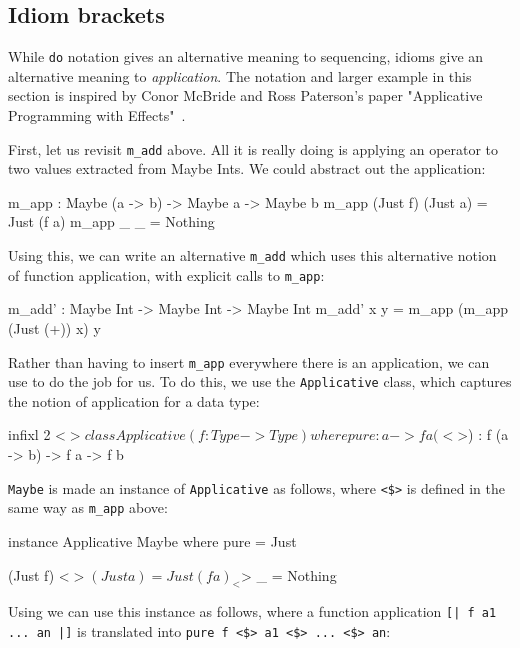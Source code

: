 \subsection{Idiom brackets}

While \texttt{do} notation gives an alternative meaning to sequencing, idioms give an
alternative meaning to \emph{application}. The notation and larger example in this
section is inspired by Conor McBride and Ross Paterson's paper "Applicative
Programming with Effects"~\cite{idioms}.

First, let us revisit \texttt{m\_add} above. All it is really doing is applying
an operator to two values extracted from Maybe Ints. We could abstract out the
application:

\begin{code}
m_app : Maybe (a -> b) -> Maybe a -> Maybe b
m_app (Just f) (Just a) = Just (f a)
m_app _        _        = Nothing
\end{code} 

\noindent
Using this, we can write an alternative \texttt{m\_add} which uses this alternative
notion of function application, with explicit calls to \texttt{m\_app}:

\begin{code}
m_add' : Maybe Int -> Maybe Int -> Maybe Int
m_add' x y = m_app (m_app (Just (+)) x) y
\end{code} 

\noindent
Rather than having to insert \texttt{m\_app} everywhere there is an
application, we can use  to do the job for us. To do
this, we use the \texttt{Applicative} class, which captures the notion of
application for a data type:

\begin{code}
infixl 2 <$> 

class Applicative (f : Type -> Type) where 
    pure  : a -> f a
    (<$>) : f (a -> b) -> f a -> f b 
\end{code} 

\noindent
\texttt{Maybe} is made an instance of \texttt{Applicative} as follows, where
\texttt{<\$>} is defined in the same way as \texttt{m\_app} above:

\begin{code}
instance Applicative Maybe where
    pure = Just

    (Just f) <$> (Just a) = Just (f a)
    _        <$> _        = Nothing
\end{code} 

\noindent
Using  we can use this instance as follows, where a function
application \texttt{[| f a1 ... an |]}
is translated into \texttt{pure f <\$> a1 <\$> ... <\$> an}:

